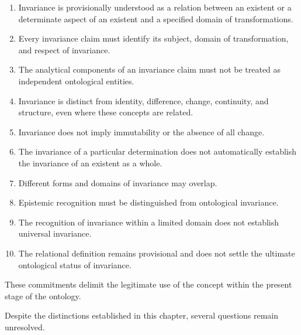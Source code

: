 \begin{enumerate}
    \item Invariance is provisionally
    understood as a relation
    between an existent or
    a determinate aspect of
    an existent and a specified
    domain of transformations.

    \item Every invariance claim
    must identify its subject,
    domain of transformation,
    and respect of invariance.

    \item The analytical components
    of an invariance claim
    must not be treated as
    independent ontological
    entities.

    \item Invariance is distinct
    from identity, difference,
    change, continuity, and
    structure, even where
    these concepts are related.

    \item Invariance does not
    imply immutability or
    the absence of all change.

    \item The invariance of
    a particular determination
    does not automatically
    establish the invariance
    of an existent as a whole.

    \item Different forms and
    domains of invariance
    may overlap.

    \item Epistemic recognition
    must be distinguished
    from ontological invariance.

    \item The recognition of
    invariance within a
    limited domain does not
    establish universal
    invariance.

    \item The relational
    definition remains
    provisional and does
    not settle the ultimate
    ontological status of
    invariance.
\end{enumerate}

These commitments delimit
the legitimate use of the
concept within the present
stage of the ontology.


Despite the distinctions
established in this chapter,
several questions remain
unresolved.

